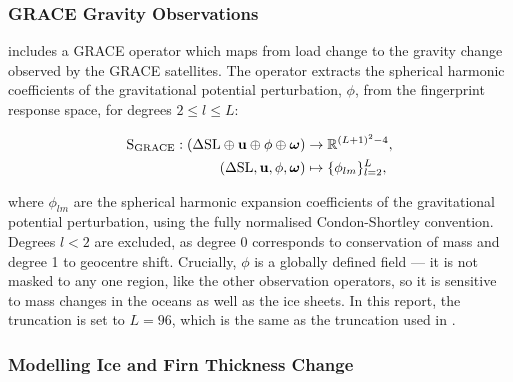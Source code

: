\subsubsection{GRACE Gravity Observations}

 includes a GRACE operator which maps from load change to the gravity change observed by the GRACE satellites. The operator extracts the spherical harmonic coefficients of the gravitational potential perturbation, $\phi$, from the fingerprint response space, for degrees $2\leq l \leq L$:

\begin{align}
    \operatorname{{S}}_{{\mathrm{GRACE}}}:
    \left(\Delta \mathrm{SL} \oplus \mathbf{u} \oplus \phi \oplus \boldsymbol{\omega}\right)
    &\to \mathbb{R}^{\left(L+1\right)^2 - 4}, \\
    \left(\Delta \mathrm{SL}, \mathbf{u}, \phi, \boldsymbol{\omega}\right)
    &\mapsto \{\phi_{lm}\}_{l=2}^{L},
\end{align}

where $\phi_{lm}$ are the spherical harmonic expansion coefficients of the gravitational potential perturbation, using the fully normalised Condon-Shortley convention. Degrees $l < 2$ are excluded, as degree 0 corresponds to conservation of mass and degree 1 to geocentre shift. Crucially, $\phi$ is a globally defined field — it is not masked to any one region, like the other observation operators, so it is sensitive to mass changes in the oceans as well as the ice sheets. In this report, the truncation is set to $L=96$, which is the same as the truncation used in \textcite{heathcoteScaleableBayesianFramework2026}.

\subsubsection{Modelling Ice and Firn Thickness Change}\label{sec:ice_thickness_priors}



